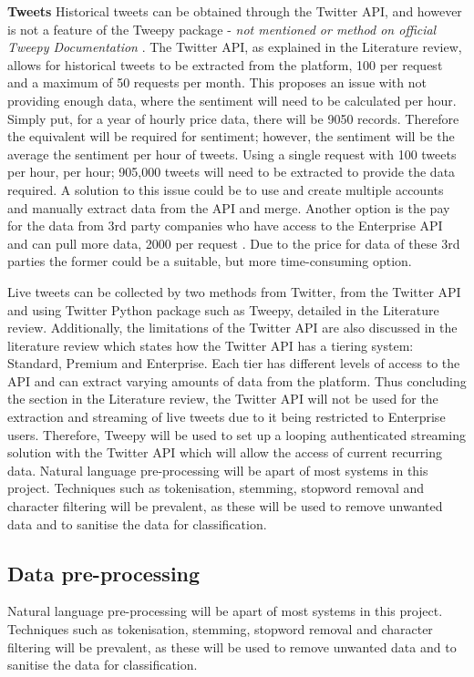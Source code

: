 \documentclass[oneside, 12pt]{article}
\begin{document}
		\textbf{Tweets}
		\newline
		\newline
		Historical tweets can be obtained through the Twitter API, and however is not a feature of the Tweepy package - \textit{not mentioned or method on official Tweepy Documentation} \cite{TweepyDoc}. The Twitter API, as explained in the Literature review, allows for historical tweets to be extracted from the platform, 100 per request and a maximum of 50 requests per month. This proposes an issue with not providing enough data, where the sentiment will need to be calculated per hour. Simply put, for a year of hourly price data, there will be 9050 records. Therefore the equivalent will be required for sentiment; however, the sentiment will be the average the sentiment per hour of tweets. Using a single request with 100 tweets per hour, per hour; 905,000 tweets will need to be extracted to provide the data required. A solution to this issue could be to use and create multiple accounts and manually extract data from the API and merge. Another option is the pay for the data from 3rd party companies who have access to the Enterprise API and can pull more data, 2000 per request \cite{SearchTweets}\cite{ConStream}. Due to the price for data of these 3rd parties the former could be a suitable, but more time-consuming option. 
		
		Live tweets can be collected by two methods from Twitter, from the Twitter API and using Twitter Python package such as Tweepy, detailed in the Literature review. Additionally, the limitations of the Twitter API are also discussed in the literature review which states how the Twitter API has a tiering system: Standard, Premium and Enterprise. Each tier has different levels of access to the API and can extract varying amounts of data from the platform. Thus concluding the section in the Literature review, the Twitter API will not be used for the extraction and streaming of live tweets due to it being restricted to Enterprise users. Therefore, Tweepy will be used to set up a looping authenticated streaming solution with the Twitter API which will allow the access of current recurring data. Natural language pre-processing will be apart of most systems in this project. Techniques such as tokenisation, stemming, stopword removal and character filtering will be prevalent, as these will be used to remove unwanted data and to sanitise the data for classification.
		
		\subsection{Data pre-processing}
		Natural language pre-processing will be apart of most systems in this project. Techniques such as tokenisation, stemming, stopword removal and character filtering will be prevalent, as these will be used to remove unwanted data and to sanitise the data for classification.
		
\end{document}
